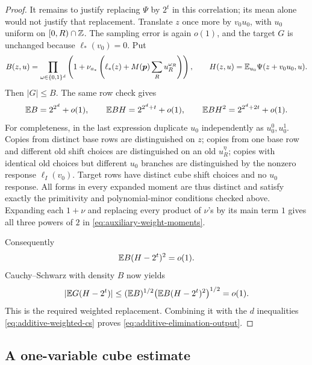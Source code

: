 \begin{proof}
It remains to justify replacing $\Psi$ by $2^t$ in this correlation;
its mean alone would not justify that replacement.  Translate $z$
once more by $v_0u_0$, with $u_0$ uniform on $[0,R)\cap\mathbb Z$.
The sampling error is again $o(1)$, and the target $G$ is unchanged
because $\ell_*(v_0)=0$.  Put
\[
 B(z,u)=\prod_{\omega\in\{0,1\}^d}
  \left(1+\nu_{a_*}\left(\ell_*(z)+M(\boldsymbol p)
                 \sum_Ru_R^{\omega_R}\right)\right),
 \qquad H(z,u)=\mathbb E_{u_0}\Psi(z+v_0u_0,u).
\]
Then $|G|\le B$.  The same row check gives
\begin{equation}
 \mathbb E B=2^{2^d}+o(1),\qquad
 \mathbb E BH=2^{2^d+t}+o(1),\qquad
 \mathbb E BH^2=2^{2^d+2t}+o(1).
 \label{eq:auxiliary-weight-moments}
\end{equation}
For completeness, in the last expression duplicate $u_0$ independently
as $u_0^0,u_0^1$.  Copies from distinct base rows are distinguished on
$z$; copies from one base row and different old shift choices are
distinguished on an old $u_R^\eta$; copies with identical old choices
but different $u_0$ branches are distinguished by the nonzero response
$\ell_I(v_0)$.  Target rows have distinct cube shift choices and no
$u_0$ response.  All forms in every expanded moment are thus distinct
and satisfy exactly the primitivity and polynomial-minor conditions
checked above.  Expanding each $1+\nu$ and replacing every product of
$\nu$'s by its main term $1$ gives all three powers of $2$ in
\eqref{eq:auxiliary-weight-moments}.

Consequently
\[
 \mathbb E B(H-2^t)^2=o(1).
\]
Cauchy--Schwarz with density $B$ now yields
\[
 |\mathbb E G(H-2^t)|
 \le (\mathbb E B)^{1/2}\bigl(\mathbb E B(H-2^t)^2\bigr)^{1/2}=o(1).
\]
This is the required weighted replacement.  Combining it with the
$d$ inequalities \eqref{eq:additive-weighted-cs} proves
\eqref{eq:additive-elimination-output}.
\end{proof}

\subsection{A one-variable cube estimate}


